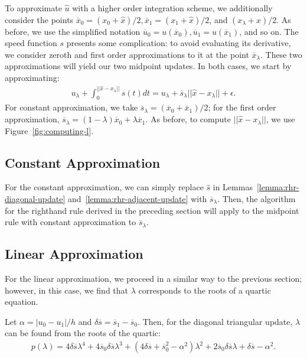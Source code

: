 \documentclass{article}
\begin{document}
To approximate $\hat{u}$ with a higher order integration scheme, we
additionally consider the points
$\overline{x}_0 = (x_0 + \hat{x})/2, \overline{x}_1 = (x_1 +
\hat{x})/2$, and $(x_\lambda + \hat{x})/2$. As before, we use the
simplified notation
$\overline{u}_0 = u(\overline{x}_0), \overline{u}_1 =
u(\overline{x}_1)$, and so on. The speed function $s$ presents some
complication: to avoid evaluating its derivative, we consider zeroth
and first order approximations to it at the point
$\overline{x}_\lambda$. These two approximations will yield our two
midpoint updates. In both cases, we start by approximating:
\begin{align*}
  u_{\lambda} + \int_0^{||\hat{x} - x_\lambda||} s(t) dt = u_\lambda + \overline{s}_\lambda ||\hat{x} - x_\lambda|| + \epsilon.
\end{align*}
For constant approximation, we take
$\overline{s}_\lambda = (\overline{x}_0 + \overline{x}_1)/2$; for the
first order approximation,
$\overline{s}_\lambda = (1 - \lambda) \overline{x}_0 + \lambda
\overline{x}_1$. As before, to compute $||\hat{x} - x_\lambda||$, we
use Figure~\ref{fig:computing-l}.

\subsection{Constant Approximation}

For the constant approximation, we can simply replace $\hat{s}$ in
Lemmas~\ref{lemma:rhr-diagonal-update}
and~\ref{lemma:rhr-adjacent-update} with $\overline{s}_\lambda$. Then,
the algorithm for the righthand rule derived in the preceding section
will apply to the midpoint rule with constant approximation to
$\overline{s}_\lambda$.

\subsection{Linear Approximation}

For the linear approximation, we proceed in a similar way to the
previous section; however, in this case, we find that $\lambda$
corresponds to the roots of a quartic equation.

\begin{lemma}\label{lemma:midpoint-diagonal-update}
  Let $\alpha = |u_0 - u_1|/h$ and
  $\delta \overline{s} = \overline{s}_1 - \overline{s}_0$. Then, for
  the diagonal triangular update, $\lambda$ can be found from the
  roots of the quartic:
  \begin{align*}
    p(\lambda) = 4 \delta \overline{s} \lambda^4 + 4 \overline{s}_0 \delta \overline{s} \lambda^3 + {(4 \delta \overline{s} + \overline{s}_0^2 - \alpha^2)} \lambda^2 + 2 \overline{s}_0 \delta \overline{s} \lambda + \delta \overline{s} - \alpha^2.
  \end{align*}
\end{lemma}
\end{document}
